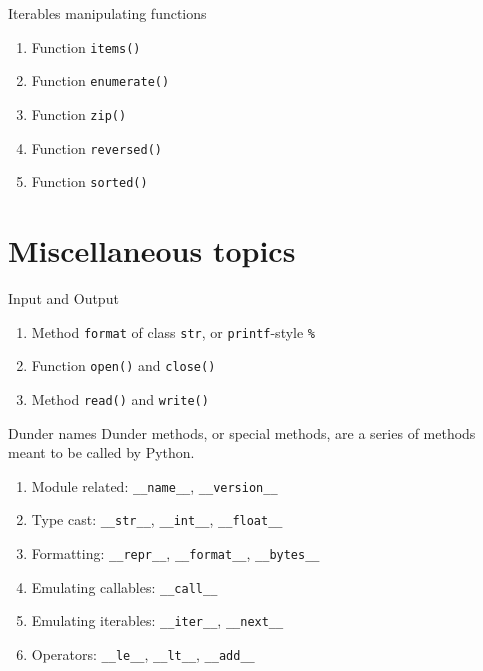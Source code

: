 \documentclass[english, nochinese]{../TeXTemplate/pkuslide}
\begin{document}
\begin{frame}[fragile]{Iterables manipulating functions}
\begin{enumerate}
\item Function \verb"items()"
\item Function \verb"enumerate()"
\item Function \verb"zip()"
\item Function \verb"reversed()"
\item Function \verb"sorted()"
\end{enumerate}
\end{frame}

\section{Miscellaneous topics}

\begin{frame}
\sectionpage
\end{frame}

\begin{frame}[fragile]{Input and Output}
\begin{enumerate}
\item Method \verb"format" of class \verb"str", or \verb"printf"-style \verb"%"
\item Function \verb"open()" and \verb"close()"
\item Method \verb"read()" and \verb"write()"
\end{enumerate}
\end{frame}

\begin{frame}[fragile]{Dunder names}
Dunder methods, or special methods, are a series of methods meant to be called by Python.
\begin{enumerate}
\item Module related: \verb"__name__", \verb"__version__"
\item Type cast: \verb"__str__", \verb"__int__", \verb"__float__"
\item Formatting: \verb"__repr__", \verb"__format__", \verb"__bytes__"
\item Emulating callables: \verb"__call__"
\item Emulating iterables: \verb"__iter__", \verb"__next__"
\item Operators: \verb"__le__", \verb"__lt__", \verb"__add__"
\end{enumerate}
\end{frame}
\end{document}
